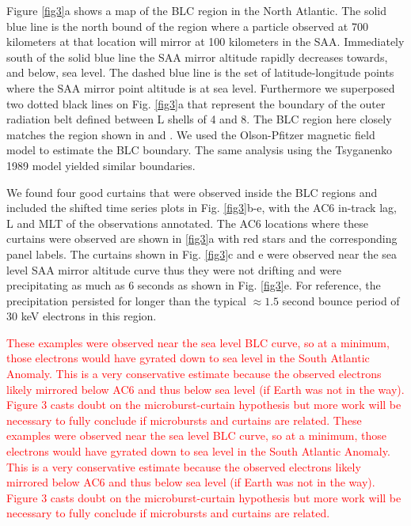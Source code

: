 \documentclass[draft]{agujournal2019}
\begin{document}
Figure \ref{fig3}a shows a map of the BLC region in the North Atlantic. The solid blue line is the north bound of the region where a particle observed at 700 kilometers at that location will mirror at 100 kilometers in the SAA. Immediately south of the solid blue line the SAA mirror altitude rapidly decreases towards, and below, sea level. The dashed blue line is the set of latitude-longitude points where the SAA mirror point altitude is at sea level. Furthermore we superposed two dotted black lines on Fig. \ref{fig3}a that represent the boundary of the outer radiation belt defined between L shells of 4 and 8. The BLC region here closely matches the region shown in  and . We used the Olson-Pfitzer magnetic field model \cite{Olson1982} to estimate the BLC boundary. The same analysis using the Tsyganenko 1989 model \cite{Tsyganenko1989} yielded similar boundaries. 

We found four good curtains that were observed inside the BLC regions and included the shifted time series plots in Fig. \ref{fig3}b-e, with the AC6 in-track lag, L and MLT of the observations annotated. The AC6 locations where these curtains were observed are shown in \ref{fig3}a with red stars and the corresponding panel labels. The curtains shown in Fig. \ref{fig3}c and e were observed near the sea level SAA mirror altitude curve thus they were not drifting and were precipitating as much as 6 seconds as shown in Fig. \ref{fig3}e. For reference, the precipitation persisted for longer than the typical $\approx 1.5$ second bounce period of 30 keV electrons in this region.

\textcolor{red}{These examples were observed near the sea level BLC curve, so at a minimum, those electrons would have gyrated down to sea level in the South Atlantic Anomaly. This is a very conservative estimate because the observed electrons likely mirrored below AC6 and thus below sea level (if Earth was not in the way). Figure 3 casts doubt on the microburst-curtain hypothesis but more work will be necessary to fully conclude if microbursts and curtains are related. These examples were observed near the sea level BLC curve, so at a minimum, those electrons would have gyrated down to sea level in the South Atlantic Anomaly. This is a very conservative estimate because the observed electrons likely mirrored below AC6 and thus below sea level (if Earth was not in the way). Figure 3 casts doubt on the microburst-curtain hypothesis but more work will be necessary to fully conclude if microbursts and curtains are related. }
\end{document}
